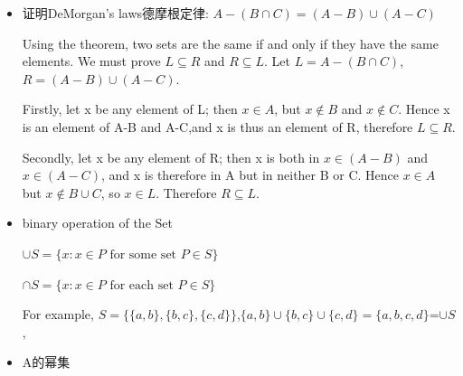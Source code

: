 \documentclass[UTF8]{ctexart}
\begin{document}
\begin{itemize}
\begin{enumerate}
        A=\{1,3,9\}, B=\{3,5,7\}, $A \cap B$=\{3\}
        \item Union $A \cup B = \{x, x \in A \text{ or } x \in B\}$
        \item The difference of two sets $A-B=\{x, x \in A \text{ and } x \notin B\}$
        \item Idempotency幂等律: $A \cap A = A$, $A \cup A = A$
        \item Commutativity交换律: $A \cup B = B \cup A$, $A \cap B = B \cap A$
        \item Associativity结合律: $(A \cup B) \cup C = A \cup (B \cup C)$, $(A \cap B) \cap C = A \cap (B \cap C)$
        \item Distributivity分配律: $(A \cup B) \cap C = (A \cap B) \cup (A \cap C)$, $(A \cap B) \cup C = (A \cup B) \cap (A \cup C)$
        \item Absorption吸收率: $(A \cap B) \cup A = A$, $(A \cup B) \cap A = A$
        \item DeMorgan's laws德摩根定律: $A-(B \cap C) = (A-B) \cup (A-C) $, $A-(B \cup C) = (A-B) \cap (A-C) $
    \end{enumerate}

    \item 证明DeMorgan's laws德摩根定律: $A-(B \cap C) = (A-B) \cup (A-C) $
    
    Using the theorem, two sets are the same if and only if they have the same elements. We must prove $L \subseteq R $ and $R \subseteq L$.
    Let $L=A-(B \cap C)$, $ R= (A-B) \cup (A-C)$. 

    Firstly, let x be any element of L; then $x \in A$, but $x \notin B$ and $x \notin C$. Hence x is an element of A-B and A-C,and x is thus an element of R, therefore $L \subseteq R$.

    Secondly, let x be any element of R; then x is both in $x \in (A-B)$ and $x \in (A-C)$, and x is therefore in A but in neither B or C. Hence $x \in A$ but $x \notin B \cup C$, so $x \in L$. Therefore $R \subseteq L$.

    \item binary operation of the Set
    
    $\cup S=\{x:x \in P \text{ for some set } P \in S \}$ 

    $\cap S=\{x:x \in P \text{ for each set } P \in S \}$ 

    For example, $S=\{\{a,b\},\{b,c\},\{c,d\}\}$,$\{a,b\}\cup\{b,c\}\cup\{c,d\}=\{a,b,c,d\}$=$\cup S$,

    \item A的幂集
    

\end{itemize}
\end{document}
